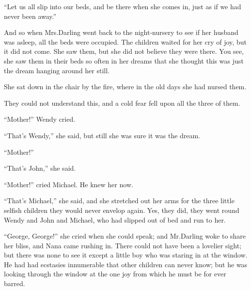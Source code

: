 “Let us all slip into our beds, and be there when she comes in,
just as if we had never been away.”

And so when Mrs.\@ Darling went back to the night‐nursery to see if her husband was asleep,
all the beds were occupied.
The children waited for her cry of joy, but it did not come.
She saw them, but she did not believe they were there.
You see, she saw them in their beds so often in her dreams
that she thought this was just the dream hanging around her still.

She sat down in the chair by the fire, where in the old days she had nursed them.

They could not understand this, and a cold fear fell upon all the three of them.

“Mother!\@” Wendy cried.

“That’s Wendy,” she said, but still she was sure it was the dream.

“Mother!”

“That’s John,” she said.

“Mother!\@” cried Michael.
He knew her now.

“That’s Michael,” she said,
and she stretched out her arms for the three little selfish children they would never envelop again.
Yes, they did, they went round Wendy and John and Michael, who had slipped out of bed and run to her.

“George, George!\@” she cried when she could speak;
and Mr.\@ Darling woke to share her bliss, and Nana came rushing in.
There could not have been a lovelier sight;
but there was none to see it except a little boy who was staring in at the window.
He had had ecstasies innumerable that other children can never know;
but he was looking through the window at the one joy from which he must be for ever barred.

\endinput

